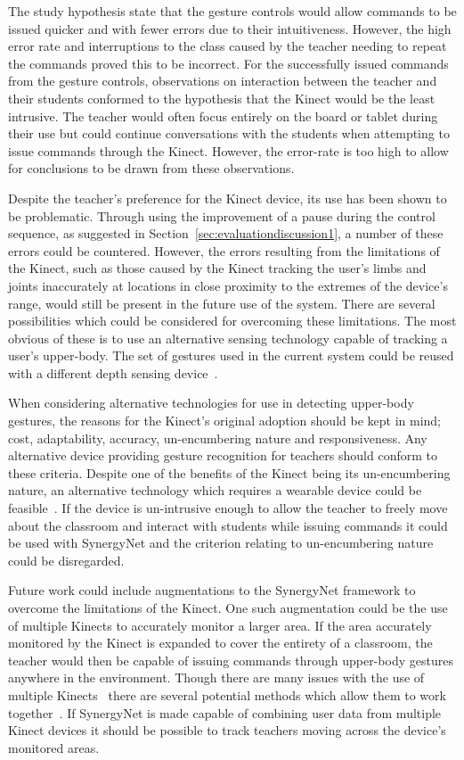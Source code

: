 \documentclass[manuscript, review, screen]{acmart}
\begin{document}
The study hypothesis state that the gesture controls would allow commands to be issued quicker and with fewer errors due to their intuitiveness.
However, the high error rate and interruptions to the class caused by the teacher needing to repeat the commands proved this to be incorrect.
For the successfully issued commands from the gesture controls, observations on interaction between the teacher and their students conformed to the hypothesis that the Kinect would be the least intrusive.
The teacher would often focus entirely on the board or tablet during their use but could continue conversations with the students when attempting to issue commands through the Kinect.
However, the error-rate is too high to allow for conclusions to be drawn from these observations.

Despite the teacher's preference for the Kinect device, its use has been shown to be problematic.
Through using the improvement of a pause during the control sequence, as suggested in Section~\ref{sec:evaluationdiscussion1}, a number of these errors could be countered.
However, the errors resulting from the limitations of the Kinect, such as those caused by the Kinect tracking the user's limbs and joints inaccurately at locations in close proximity to the extremes of the device's range, would still be present in the future use of the system.
There are several possibilities which could be considered for overcoming these limitations.
The most obvious of these is to use an alternative sensing technology capable of tracking a user's upper-body.
The set of gestures used in the current system could be reused with a different depth sensing device~\cite{Kean2011}.

When considering alternative technologies for use in detecting upper-body gestures, the reasons for the Kinect's original adoption should be kept in mind; cost, adaptability, accuracy, un-encumbering nature and responsiveness.
Any alternative device providing gesture recognition for teachers should conform to these criteria.
Despite one of the benefits of the Kinect being its un-encumbering nature, an alternative technology which requires a wearable device could be feasible~\cite{Rekimotoa,Zhu2011}.
If the device is un-intrusive enough to allow the teacher to freely move about the classroom and interact with students while issuing commands it could be used with SynergyNet and the criterion relating to un-encumbering nature could be disregarded. 

Future work could include augmentations to the SynergyNet framework to overcome the limitations of the Kinect.
One such augmentation could be the use of multiple Kinects to accurately monitor a larger area.
If the area accurately monitored by the Kinect is expanded to cover the entirety of a classroom, the teacher would then be capable of issuing commands through upper-body gestures anywhere in the environment.
Though there are many issues with the use of multiple Kinects~\cite{Maimone2012,Schroder2011} there are several potential methods which allow them to work together~\cite{Wang2012}.
If SynergyNet is made capable of combining user data from multiple Kinect devices it should be possible to track teachers moving across the device's monitored areas.
\end{document}
